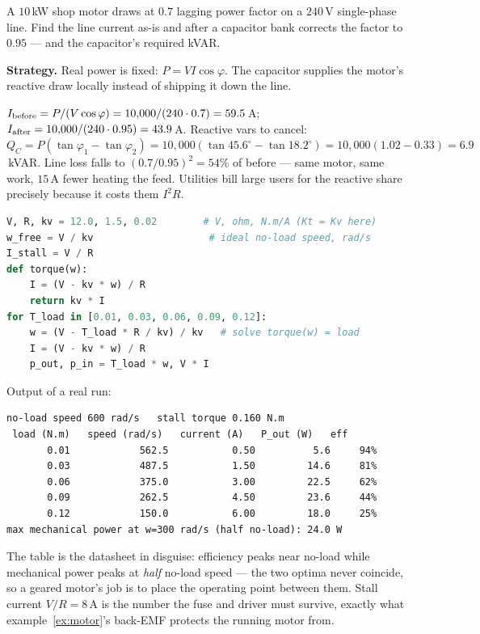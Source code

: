 \begin{example}\label{ex:pfcorr}
A $10$\,kW shop motor draws at $0.7$ lagging power factor on a
$240$\,V single-phase line. Find the line current as-is and after a
capacitor bank corrects the factor to $0.95$ --- and the capacitor's
required kVAR.
\par\smallskip
\textbf{Strategy.} Real power is fixed: $P=VI\cos\varphi$. The
capacitor supplies the motor's reactive draw locally instead of
shipping it down the line.
\begin{solution}
$I_{\rm before}=P/(V\cos\varphi)=10{,}000/(240\cdot0.7)=59.5$\,A;
$I_{\rm after}=10{,}000/(240\cdot0.95)=43.9$\,A.
Reactive vars to cancel:
$Q_C=P(\tan\varphi_1-\tan\varphi_2)
=10{,}000(\tan45.6^{\circ}-\tan18.2^{\circ})
=10{,}000(1.02-0.33)=6.9$\,kVAR.
Line loss falls to $(0.7/0.95)^{2}=54\%$ of before --- same motor, same work,
$15$\,A fewer heating the feed. Utilities bill large users for the
reactive share precisely because it costs them $I^{2}R$.
\checkmark
\end{solution}
\end{example}

\begin{lstlisting}[language=Python,caption={\texttt{code/ch18\_motor\_op.py} --- DC motor operating point: the torque--speed line meets the load.},label={lst:motorop}]
V, R, kv = 12.0, 1.5, 0.02        # V, ohm, N.m/A (Kt = Kv here)
w_free = V / kv                    # ideal no-load speed, rad/s
I_stall = V / R
def torque(w):
    I = (V - kv * w) / R
    return kv * I
for T_load in [0.01, 0.03, 0.06, 0.09, 0.12]:
    w = (V - T_load * R / kv) / kv   # solve torque(w) = load
    I = (V - kv * w) / R
    p_out, p_in = T_load * w, V * I
\end{lstlisting}

Output of a real run:
\begin{lstlisting}[numbers=none]
no-load speed 600 rad/s   stall torque 0.160 N.m
 load (N.m)   speed (rad/s)   current (A)   P_out (W)   eff
       0.01            562.5           0.50          5.6     94%
       0.03            487.5           1.50         14.6     81%
       0.06            375.0           3.00         22.5     62%
       0.09            262.5           4.50         23.6     44%
       0.12            150.0           6.00         18.0     25%
max mechanical power at w=300 rad/s (half no-load): 24.0 W
\end{lstlisting}

The table is the datasheet in disguise: efficiency peaks near
no-load while mechanical power peaks at \emph{half} no-load speed
--- the two optima never coincide, so a geared motor's job is to
place the operating point between them. Stall current $V/R=8$\,A is
the number the fuse and driver must survive, exactly what
example~\ref{ex:motor}'s back-EMF protects the running motor from.

